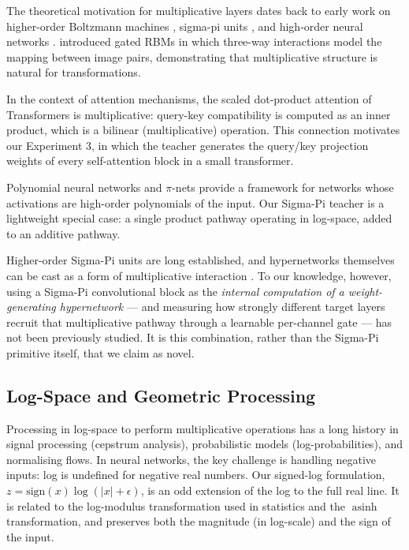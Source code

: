 \documentclass{article}
\begin{document}
The theoretical motivation for multiplicative layers dates back to early work on higher-order Boltzmann machines \citep{sejnowski1986higher}, sigma-pi units
\citep{rumelhart1986parallel}, and high-order neural networks
\citep{giles1987highorder,shin1991pisigma}. \citet{memisevic2010learning}
introduced gated RBMs in which three-way interactions model the mapping between image pairs, demonstrating that multiplicative structure is natural for transformations.

In the context of attention mechanisms, the scaled dot-product attention of Transformers \citep{vaswani2017attention} is multiplicative: query-key compatibility is computed as an inner product, which is a bilinear (multiplicative) operation. This connection motivates our Experiment 3, in which the teacher generates the query/key projection weights of every self-attention block in a small transformer.

Polynomial neural networks \citep{chrysos2022pnetstpami} and $\pi$-nets provide a framework for networks whose activations are high-order polynomials of the input. Our Sigma-Pi teacher is a lightweight special case: a single product pathway operating in log-space, added to an additive pathway.

Higher-order Sigma-Pi units \citep{rumelhart1986parallel,shin1991pisigma} are long established, and hypernetworks themselves can be cast as a form of multiplicative interaction \citep{jayakumar2020multiplicative}. To our knowledge, however, using a Sigma-Pi convolutional block as the \emph{internal computation of a weight-generating hypernetwork} --- and measuring how strongly different target layers recruit that multiplicative pathway through a learnable per-channel gate --- has not been previously studied. It is this combination, rather than the Sigma-Pi primitive itself, that we claim as novel.

\subsection{Log-Space and Geometric Processing}\label{log-space-and-geometric-processing}

Processing in log-space to perform multiplicative operations has a long history in signal processing (cepstrum analysis), probabilistic models (log-probabilities), and normalising flows. In neural networks, the key challenge is handling negative inputs: log is undefined for negative real numbers. Our signed-log formulation, $z=\mathrm{sign}(x)\log(|x|+\epsilon)$, is an odd extension of the log to the full real line. It is related to the log-modulus transformation used in statistics \citep{john1980outliers} and the $\operatorname{asinh}$ transformation, and preserves both the magnitude (in log-scale) and the sign of the input.
\end{document}
